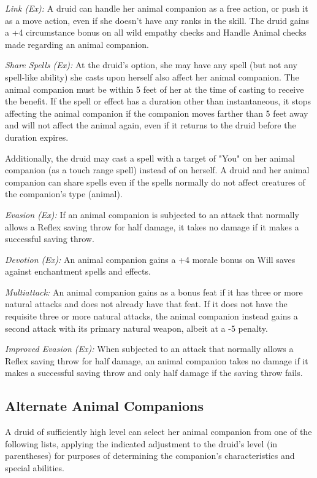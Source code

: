 \textit{Link (Ex):} A druid can handle her animal companion as a free action, or push it as a move action, even if she doesn't have any ranks in the  skill. The druid gains a +4 circumstance bonus on all wild empathy checks and Handle Animal checks made regarding an animal companion.

\textit{Share Spells (Ex):} At the druid's option, she may have any spell (but not any spell-like ability) she casts upon herself also affect her animal companion. The animal companion must be within 5 feet of her at the time of casting to receive the benefit. If the spell or effect has a duration other than instantaneous, it stops affecting the animal companion if the companion moves farther than 5 feet away and will not affect the animal again, even if it returns to the druid before the duration expires. 

Additionally, the druid may cast a spell with a target of "You" on her animal companion (as a touch range spell) instead of on herself. A druid and her animal companion can share spells even if the spells normally do not affect creatures of the companion's type (animal).

\textit{Evasion (Ex):} If an animal companion is subjected to an attack that normally allows a Reflex saving throw for half damage, it takes no damage if it makes a successful saving throw.

\textit{Devotion (Ex):} An animal companion gains a +4 morale bonus on Will saves against enchantment spells and effects.

\textit{Multiattack:} An animal companion gains  as a bonus feat if it has three or more natural attacks and does not already have that feat. If it does not have the requisite three or more natural attacks, the animal companion instead gains a second attack with its primary natural weapon, albeit at a -5 penalty.

\textit{Improved Evasion (Ex):} When subjected to an attack that normally allows a Reflex saving throw for half damage, an animal companion takes no damage if it makes a successful saving throw and only half damage if the saving throw fails.

\subsection{Alternate Animal Companions}

A druid of sufficiently high level can select her animal companion from one of 
the following lists, applying the indicated adjustment to the druid's level (in 
parentheses) for purposes of determining the companion's characteristics and special 
abilities.

